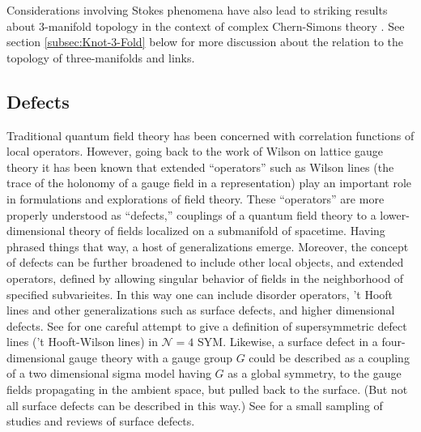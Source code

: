 \documentclass[12pt]{article}
\newcommand\CalN{\mathcal{N}}
\begin{document}
Considerations involving Stokes phenomena have also
lead to striking results about 3-manifold topology
in the context of complex Chern-Simons theory \cite{Gu:2021ize,Garoufalidis:2020xec,Witten:2010cx}.
See section \ref{subsec:Knot-3-Fold} below for more discussion about the relation to the topology
of three-manifolds and links.



\subsection{Defects}
\label{sec:Defects}


Traditional quantum field theory has been concerned with correlation
functions of local operators. However, going back to the work of Wilson on
lattice gauge theory it has been known that extended ``operators'' such as
Wilson lines (the trace of the holonomy of a gauge field in a representation)
play an important role in formulations and explorations of field
theory. These ``operators'' are more properly understood as ``defects,''
couplings of a quantum field theory to a lower-dimensional theory of fields
localized on a submanifold
of spacetime. Having phrased things that way, a host of generalizations emerge. 
Moreover, the concept of defects can be further broadened to include other 
local objects, and extended operators, defined by allowing singular behavior of fields in the neighborhood of specified subvarieites. In this way one can include disorder operators, 't Hooft lines and other generalizations such as 
surface defects, and higher dimensional defects.
 See \cite{Kapustin:2005py} for one careful attempt to give a definition of supersymmetric defect lines ('t Hooft-Wilson lines)  in ${\CalN}=4$ SYM. Likewise, a surface defect in a four-dimensional gauge theory with a gauge group $G$ could be described as a coupling of a two dimensional 
sigma model having $G$ as a global symmetry, to the gauge fields propagating in the ambient space, but pulled back to the surface. (But not all surface defects can be described in this way.)   See  
\cite{Avatars, Braverman:2004vv, NN2004:BPSCFT1, Gukov:2008sn, Gaiotto:2013sma, Gukov:2014gja, nekrasovbpscft4, nekrasovbpscft5} for a small sampling of studies and reviews of surface defects.
\end{document}
